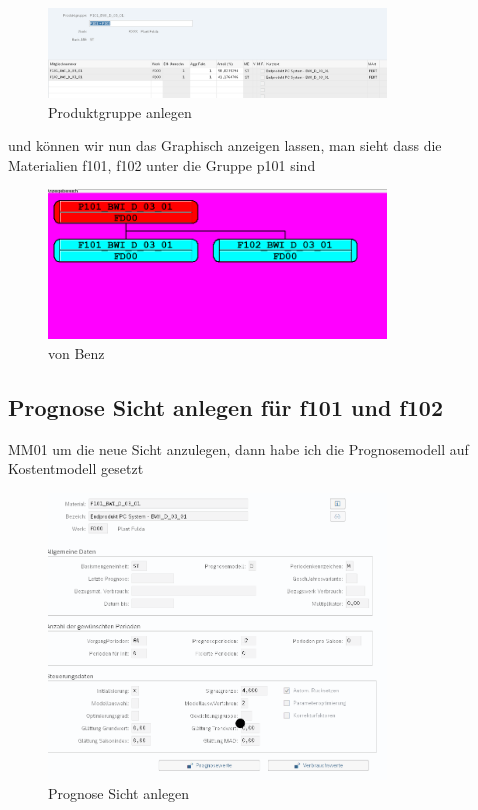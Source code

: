 \documentclass{article}
\begin{document}
\begin{itemize}

\begin{figure}[H]
\vspace{-10pt}
  \centering
  \includegraphics[width=0.8\textwidth]{p101.png}
  \caption{Produktgruppe anlegen }
  \label{fig:image}
\end{figure}
und können wir nun das Graphisch anzeigen lassen, man sieht dass die Materialien f101, f102 unter die Gruppe p101 sind 
\begin{figure}[H]
\vspace{-10pt}
  \centering
  \includegraphics[width=0.8\textwidth]{gra.png}
  \caption{von Benz }
  \label{fig:image}
\end{figure}



\subsection{Prognose Sicht anlegen für f101 und f102}
MM01 um die neue Sicht anzulegen, dann habe ich die Prognosemodell auf Kostentmodell gesetzt

\begin{figure}[H]
\vspace{-10pt}
  \centering
  \includegraphics[width=0.8\textwidth]{kostenmodel.png}
  \caption{Prognose Sicht anlegen }
  \label{fig:image}
\end{figure}


\end{itemize}
\end{document}
